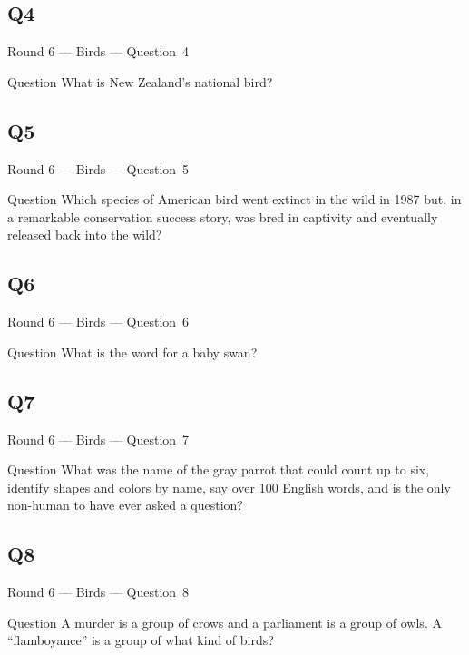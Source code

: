 \documentclass[11pt]{beamer}
\begin{document}
\subsection*{Q4}
\begin{frame}[t]{Round 6 --- Birds --- \mbox{Question 4}}
    \vspace{-0.5em}
    \begin{block}{Question}
        What is New Zealand's national bird?
    \end{block}
\end{frame}
\subsection*{Q5}
\begin{frame}[t]{Round 6 --- Birds --- \mbox{Question 5}}
    \vspace{-0.5em}
    \begin{block}{Question}
        Which species of American bird went extinct in the wild in 1987 but, in a remarkable conservation success story, was bred in captivity and eventually released back into the wild?
    \end{block}
\end{frame}
\subsection*{Q6}
\begin{frame}[t]{Round 6 --- Birds --- \mbox{Question 6}}
    \vspace{-0.5em}
    \begin{block}{Question}
        What is the word for a baby swan?
    \end{block}
\end{frame}
\subsection*{Q7}
\begin{frame}[t]{Round 6 --- Birds --- \mbox{Question 7}}
    \vspace{-0.5em}
    \begin{block}{Question}
        What was the name of the gray parrot that could count up to six, identify shapes and colors by name, say over 100 English words, and is the only non-human to have ever asked a question?
    \end{block}
\end{frame}
\subsection*{Q8}
\begin{frame}[t]{Round 6 --- Birds --- \mbox{Question 8}}
    \vspace{-0.5em}
    \begin{block}{Question}
        A murder is a group of crows and a parliament is a group of owls. A ``flamboyance'' is a group of what kind of birds?
    \end{block}
\end{frame}
\end{document}
